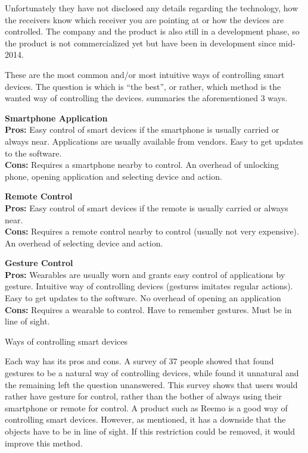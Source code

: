 Unfortunately they have not disclosed any details regarding the technology, 
how the receivers know which receiver you are pointing at or how the devices are controlled. 
The company and the product is also still in a development phase, 
so the product is not commercialized yet but have been in development since mid-2014.

These are the most common and/or most intuitive ways of controlling smart devices. 
The question is which is ``the best'', or rather, which method is the wanted way of controlling the devices.
 summaries the aforementioned 3 ways. 

\begin{table}[!htb]
    \centering
    \parbox[t][][t]{0.3\textwidth}{
        \textbf{Smartphone Application}\\
        \textbf{Pros:} Easy control of smart devices if the smartphone is usually carried or always near. 
                       Applications are usually available from vendors. 
                       Easy to get updates to the software. \\
        \textbf{Cons:} Requires a smartphone nearby to control. 
                       An overhead of unlocking phone, opening application and selecting device and action.
    }\quad
    \parbox[t][][t]{0.3\textwidth}{
        \textbf{Remote Control}\\
        \textbf{Pros:} Easy control of smart devices if the remote is usually carried or always near. \\
        \textbf{Cons:} Requires a remote control nearby to control (usually not very expensive). 
                       An overhead of selecting device and action.
    }\quad
    \parbox[t][][t]{0.3\textwidth}{
        \textbf{Gesture Control}\\
        \textbf{Pros:} Wearables are usually worn and grants easy control of applications by gesture.
                       Intuitive way of controlling devices (gestures imitates regular actions).
                       Easy to get updates to the software. 
                       No overhead of opening an application\\
        \textbf{Cons:} Requires a wearable to control. 
                       Have to remember gestures.
                       Must be in line of sight. 
    }
    \caption{Ways of controlling smart devices}
    \label{tbl:smartcontrol}
\end{table}

Each way has its pros and cons. 
A survey of 37 people showed that  found gestures to be a natural way of controlling devices, 
while  found it unnatural and the remaining left the question unanswered\cite{Kela2006}. 
This survey shows that users would rather have gesture for control, 
rather than the bother of always using their smartphone or remote for control.  
A product such as Reemo is a good way of controlling smart devices. 
However, as mentioned, it has a downside that the objects have to be in line of sight. 
If this restriction could be removed, it would improve this method. 

